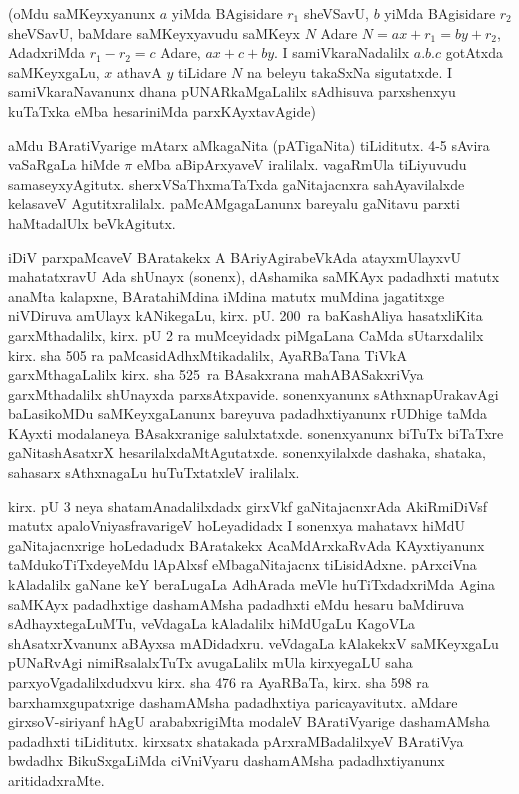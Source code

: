(oMdu saMKeyxyanunx $a$ yiMda BAgisidare $r_{1}$ sheVSavU, $b$ yiMda BAgisidare $r_{2}$ sheVSavU, baMdare saMKeyxyavudu saMKeyx $N$ Adare $N=ax+r_{1}=by+r_{2}$, AdadxriMda $r_{1}-r_{2}=c$ Adare, $ax+c+by$. I samiVkaraNadalilx $a. b. c$ gotAtxda saMKeyxgaLu, $x$ athavA $y$ tiLidare $N$ na beleyu takaSxNa sigutatxde. I samiVkaraNavanunx dhana pUNARkaMgaLalilx sAdhisuva parxshenxyu kuTaTxka eMba hesariniMda parxKAyxtavAgide)

aMdu BAratiVyarige mAtarx aMkagaNita (pATigaNita) tiLiditutx. {\rm 4-5} sAvira vaSaRgaLa hiMde $\pi$ eMba aBipArxyaveV iralilalx. vagaRmUla tiLiyuvudu samaseyx\-yAgitutx. sherxVSaThxmaTaTxda gaNitajacnxra sahAyavilalxde kelasaveV Agutitxralilalx. paMcAMgagaLanunx bareyalu gaNitavu parxti haMtadalUlx beVkAgitutx.

iDiV parxpaMcaveV BAratakekx A BAriyAgirabeVkAda atayxmUlayxvU mahatatxravU Ada shUnayx (sonenx), dAshamika saMKAyx padadhxti matutx anaMta kalapxne, BArata\break hiMdina iMdina matutx muMdina jagatitxge niVDiruva amUlayx kANikegaLu, kirx. pU. {\rm 200}~ra baKashAliya hasatxliKita garxMthadalilx, kirx. pU {\rm 2} ra muMceyidadx piMgaLana CaMda sUtarxdalilx kirx. sha {\rm 505} ra paMcasidAdhxMtikadalilx, AyaRBaTana TiVkA garxMthagaLalilx kirx. sha {\rm 525}~ra BAsakxrana mahABASakxriVya garxMthadalilx shUnayxda parxsAtxpavide. sonenxyanunx sAthxnapUrakavAgi baLasikoMDu saMKeyxgaLanunx bareyuva padadhxtiyanunx rUDhige taMda KAyxti modalaneya BAsakxranige salulxtatxde. sonenxyanunx biTuTx biTaTxre gaNitashAsatxrX hesarilalx\-daMtAgutatxde. sonenxyilalxde dashaka, shataka, sahasarx sAthxnagaLu huTuTxtatxleV iralilalx. 

kirx. pU {\rm 3} neya shatamAnadalilxdadx girxVkf gaNitajacnxrAda AkiRmiDiVsf matutx apaloV\-niyasfravarigeV hoLeyadidadx I sonenxya mahatavx hiMdU gaNitajacnxrige hoLedadudx BAratakekx AcaMdArxkaRvAda KAyxtiyanunx taMdukoTiTxdeyeMdu lApAlxsf eMba\break gaNitajacnx tiLisidAdxne. pArxciVna kAladalilx gaNane keY beraLugaLa AdhArada meVle huTiTxdadx\-riMda Agina saMKAyx padadhxtige dashamAMsha padadhxti eMdu hesaru baMdiruva sAdhayxtegaLuMTu, veVdagaLa kAladalilx hiMdUgaLu KagoVLa shAsatxrXvanunx aBAyxsa mADidadxru. veVdagaLa kAlakekxV saMKeyxgaLu pUNaRvAgi nimiRsalalxTuTx avugaLalilx mUla kirxyegaLU saha parxyoVgadalilxdudxvu kirx. sha {\rm 476} ra AyaRBaTa, kirx. sha {\rm 598} ra barxhamxgupatxrige dashamAMsha padadhxtiya paricayavitutx. aMdare girxsoV-siriyanf hAgU arababxrigiMta modaleV BAratiVyarige dashamAMsha padadhxti tiLiditutx. kirxsatx shatakada pArxraMBadalilxyeV BAratiVya bwdadhx BikuSxgaLiMda ciVniVyaru dashamAMsha padadhxtiyanunx aritidadxraMte.

